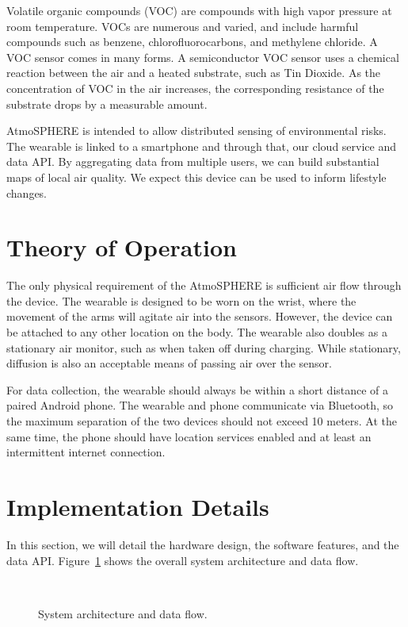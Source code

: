 \documentclass{sigchi}
\begin{document}
Volatile organic compounds (VOC) are compounds with high vapor pressure at room temperature.
VOCs are numerous and varied, and include harmful compounds such as benzene, chlorofluorocarbons, and methylene chloride.
A VOC sensor comes in many forms.
A semiconductor VOC sensor uses a chemical reaction between the air and a heated substrate, such as Tin Dioxide\cite{VOCSensor:Datasheet}.
As the concentration of VOC in the air increases, the corresponding resistance of the substrate drops by a measurable amount.

AtmoSPHERE is intended to allow distributed sensing of environmental risks.
The wearable is linked to a smartphone and through that, our cloud service and data API.
By aggregating data from multiple users, we can build substantial maps of local air quality.
We expect this device can be used to inform lifestyle changes.

\section{Theory of Operation}
The only physical requirement of the AtmoSPHERE is sufficient air flow through the device.
The wearable is designed to be worn on the wrist, where the movement of the arms will agitate air into the sensors.
However, the device can be attached to any other location on the body.
The wearable also doubles as a stationary air monitor, such as when taken off during charging.
While stationary, diffusion is also an acceptable means of passing air over the sensor.

For data collection, the wearable should always be within a short distance of a paired Android phone.
The wearable and phone communicate via Bluetooth, so the maximum separation of the two devices should not exceed 10 meters.
At the same time, the phone should have location services enabled and at least an intermittent internet connection.

\section{Implementation Details}
In this section, we will detail the hardware design, the software features, and the data API.
Figure~\ref{fig:software block} shows the overall system architecture and data flow.
\begin{figure}
    \centering
    
    \caption{System architecture and data flow.}
    ~\label{fig:software block}
\end{figure}
\end{document}
